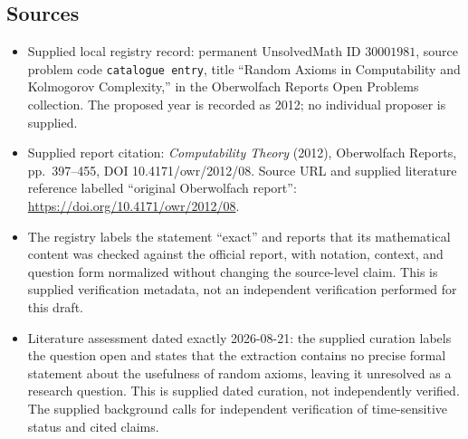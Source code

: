 \documentclass[11pt]{article}
\begin{document}
\subsection{Sources}
\begin{itemize}
\item Supplied local registry record: permanent UnsolvedMath ID \(30001981\), source problem code \texttt{catalogue entry}, title ``Random Axioms in Computability and Kolmogorov Complexity,'' in the Oberwolfach Reports Open Problems collection. The proposed year is recorded as 2012; no individual proposer is supplied.
\item Supplied report citation: \emph{Computability Theory} (2012), Oberwolfach Reports, pp.\ 397--455, DOI 10.4171/owr/2012/08. Source URL and supplied literature reference labelled ``original Oberwolfach report'': \url{https://doi.org/10.4171/owr/2012/08}.
\item The registry labels the statement ``exact'' and reports that its mathematical content was checked against the official report, with notation, context, and question form normalized without changing the source-level claim. This is supplied verification metadata, not an independent verification performed for this draft.
\item Literature assessment dated exactly 2026-08-21: the supplied curation labels the question open and states that the extraction contains no precise formal statement about the usefulness of random axioms, leaving it unresolved as a research question. This is supplied dated curation, not independently verified. The supplied background calls for independent verification of time-sensitive status and cited claims.
\end{itemize}
\end{document}
